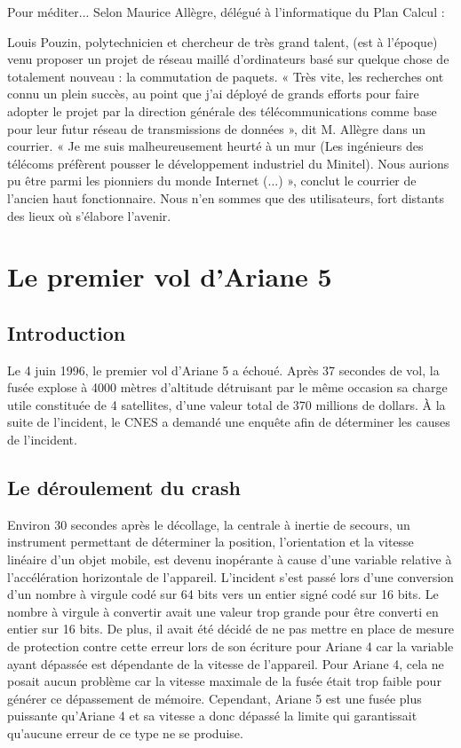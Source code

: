 \documentclass[12pt]{report}
\begin{document}
Pour méditer... Selon Maurice Allègre, délégué à l'informatique du Plan Calcul :

\og Louis Pouzin, polytechnicien et chercheur de très grand talent, (est à l'époque) venu proposer un projet de réseau maillé d'ordinateurs basé sur quelque chose de totalement nouveau : la commutation de paquets. « Très vite, les recherches ont connu un plein succès, au point que j'ai déployé de grands efforts pour faire adopter le projet par la direction générale des télécommunications comme base pour leur futur réseau de transmissions de données », dit M. Allègre dans un courrier. « Je me suis malheureusement heurté à un mur (Les ingénieurs des télécoms préfèrent pousser le développement industriel du Minitel). Nous aurions pu être parmi les pionniers du monde Internet (...) », conclut le courrier de l'ancien haut fonctionnaire. Nous n'en sommes que des utilisateurs, fort distants des lieux où s'élabore l'avenir. \fg\cite{wikipouzin}


\chapter{Le premier vol d'Ariane 5}

\section{Introduction}

Le 4 juin 1996, le premier vol d'Ariane 5 a échoué. Après 37 secondes de vol, la fusée explose à 4000 mètres d'altitude 
détruisant par le même occasion sa charge utile constituée de 4 satellites, d'une valeur total de 370 millions de dollars.
À la suite de l'incident, le CNES a demandé une enquête afin de déterminer les causes de l'incident.

\section{Le déroulement du crash}

Environ 30 secondes après le décollage, la centrale à inertie de secours, un instrument permettant de déterminer la position, l'orientation et la vitesse linéaire d'un objet mobile, est devenu inopérante à cause d'une variable relative à l'accélération horizontale de l'appareil. L'incident s'est passé lors d'une conversion    
d'un nombre à virgule codé sur 64 bits vers un entier signé codé sur 16 bits. Le nombre à virgule à convertir avait une valeur trop grande pour être converti en entier sur 16 bits. De plus, il avait été décidé de ne pas mettre en place de mesure de protection contre cette erreur lors de son écriture pour Ariane 4 car la variable ayant dépassée est dépendante de la vitesse de l'appareil. Pour Ariane 4, cela ne posait aucun problème car la vitesse maximale de la fusée était trop faible pour générer ce dépassement de mémoire. Cependant, Ariane 5 est une fusée plus puissante qu'Ariane 4 et sa vitesse a donc dépassé la limite qui garantissait qu'aucune erreur de ce type ne se produise\cite{ariane}.
\end{document}
